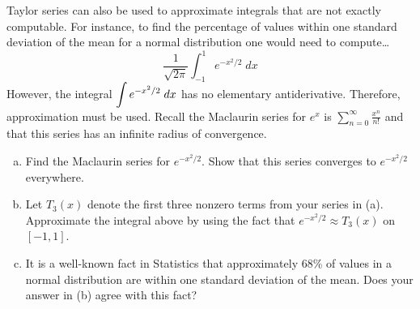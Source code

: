\documentclass[11pt,letterpaper]{article}
\begin{document}
\newpage



 Taylor series can also be used to approximate integrals that are not exactly computable. For instance, to find the percentage of values within one standard deviation of the mean for a normal distribution one would need to compute\dots
	\[
	\dfrac{1}{\sqrt{2\pi}} \int_{-1}^1 e^{-x^2/2} \;dx
	\]
However, the integral $\displaystyle \int e^{-x^2/2} \; dx$ has no elementary antiderivative. Therefore, approximation must be used. Recall the Maclaurin series for $e^x$ is $\sum_{n=0}^\infty \frac{x^n}{n!}$ and that this series has an infinite radius of convergence. 
	\begin{enumerate}[(a)]
	\item Find the Maclaurin series for $e^{-x^2/2}$. Show that this series converges to $e^{-x^2/2}$ everywhere. 
	\item Let $T_3(x)$ denote the first three nonzero terms from your series in (a). Approximate the integral above by using the fact that $e^{-x^2/2} \approx T_3(x)$ on $[-1, 1]$. 
	\item It is a well-known fact in Statistics that approximately 68\% of values in a normal distribution are within one standard deviation of the mean. Does your answer in (b) agree with this fact? 
	\end{enumerate} \pspace
\end{document}
